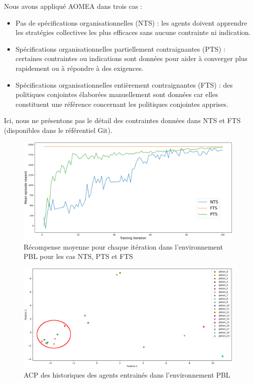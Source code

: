 \documentclass[contribution]{jfsma}
\begin{document}
Nous avons appliqué AOMEA dans trois cas :
\begin{itemize}
  \item Pas de spécifications organisationnelles (NTS) : les agents doivent apprendre les stratégies collectives les plus efficaces sans aucune contrainte ni indication.
  \item Spécifications organisationnelles partiellement contraignantes (PTS) : certaines contraintes ou indications sont données pour aider à converger plus rapidement ou à répondre à des exigences.
  \item Spécifications organisationnelles entièrement contraignantes (FTS) : des politiques conjointes élaborées manuellement sont données car elles constituent une référence concernant les politiques conjointes apprises.
\end{itemize}

Ici, nous ne présentons pas le détail des contraintes données dans NTS et FTS (disponibles dans le référentiel Git\footnotemark[1]).

\begin{figure}[h!]
  \centering
  \includegraphics[width=0.76\linewidth]{figures/prahom_learning_curve.png}
  \caption{Récompense moyenne pour chaque itération dans l'environnement PBL pour les cas NTS, PTS et FTS}
  \label{fig:prahom_learning_curve}
\end{figure}

\begin{figure}[h!]
  \centering
  \includegraphics[width=0.75\linewidth]{figures/prahom_pca_analysis.png}
  \caption{ACP des historiques des agents entrainés dans l'environnement PBL}
  \label{fig:prahom_pca_analysis}
\end{figure}
\end{document}

